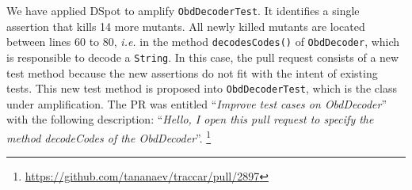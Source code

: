 \documentclass[table,xcdraw,smallextended]{svjour3}
\newcommand{\ie}{\textit{i.e.}\xspace}
\newcommand{\dspot}{DSpot\xspace}
\begin{document}
We have applied \dspot to amplify \texttt{ObdDecoderTest}. It identifies a single assertion that kills 14 more mutants.
All newly killed mutants are located between lines 60 to 80, \ie in the method \texttt{decodesCodes()} of \texttt{ObdDecoder}, which is responsible to decode a \texttt{String}. In this case, the pull request consists of a new test method because the new assertions do not fit with the intent of existing tests. 
This new test method is proposed into \texttt{ObdDecoderTest}, which is the class under amplification. The PR was entitled ``\emph{Improve test cases on ObdDecoder}'' with the following description: ``\emph{Hello, I open this pull request to specify the method decodeCodes of the ObdDecoder}''. \footnote{\url{https://github.com/tananaev/traccar/pull/2897}}
\begin{figure}[H]
    \centering{}
\end{figure}
\end{document}
